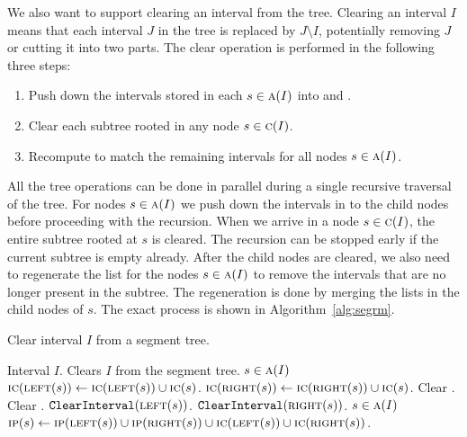 \documentclass[english,gradu]{tktltiki2018}
\begin{document}
We also want to support clearing an interval from the tree.
Clearing an interval $I$ means that each interval $J$ in the tree is replaced by $J\setminus I$, potentially removing $J$ or cutting it into two parts.
The clear operation is performed in the following three steps:
\begin{enumerate}
\item Push down the intervals stored in each $s\in\textsc{a}(I)$ into  and .
\item Clear each subtree rooted in any node $s\in\textsc{c}(I)$.
\item Recompute  to match the remaining intervals for all nodes $s\in\textsc{a}(I)$.
\end{enumerate}

All the tree operations can be done in parallel during a single recursive traversal of the tree.
For nodes $s\in\textsc{a}(I)$ we push down the intervals in  to the child nodes before proceeding with the recursion.
When we arrive in a node $s\in\textsc{c}(I)$, the entire subtree rooted at $s$ is cleared.
The recursion can be stopped early if the current subtree is empty already.
After the child nodes are cleared, we also need to regenerate the  list for the nodes $s\in\textsc{a}(I)$ to remove the intervals that are no longer present in the subtree.
The regeneration is done by merging the lists in the child nodes of $s$.
The exact process is shown in Algorithm~\ref{alg:segrm}.

\begin{algorithm}
\caption{Clear interval $I$ from a segment tree.}\label{alg:segrm}
\begin{algorithmic}
\Require Interval $I$.
\Ensure Clears $I$ from the segment tree.
		\State \Return
	\EndIf
		\Comment $s\in\textsc{a}(I)$
		\State $\textsc{ic}(\textsc{left}(s)) \gets \textsc{ic}(\textsc{left}(s)) \cup \textsc{ic}(s)$.
		\State $\textsc{ic}(\textsc{right}(s)) \gets \textsc{ic}(\textsc{right}(s)) \cup \textsc{ic}(s)$.
	\EndIf
	\State Clear .
	\State Clear .
		\State $\texttt{ClearInterval}(\textsc{left}(s))$.
		\State $\texttt{ClearInterval}(\textsc{right}(s))$.
	\EndIf
		\Comment $s\in\textsc{a}(I)$
		\State $\textsc{ip}(s)\gets \textsc{ip}(\textsc{left}(s)) \cup \textsc{ip}(\textsc{right}(s)) \cup \textsc{ic}(\textsc{left}(s)) \cup \textsc{ic}(\textsc{right}(s))$.
	\EndIf
\EndProcedure
\end{algorithmic}
\end{algorithm}
\end{document}
